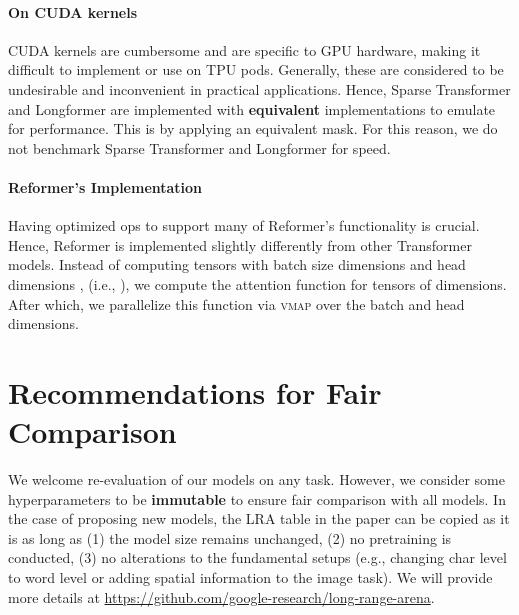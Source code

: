 \documentclass{article} \usepackage{iclr2021_conference,times}
\begin{document}
\paragraph{On CUDA kernels} 
CUDA kernels are cumbersome and are specific to GPU hardware, making it difficult to implement or use on TPU pods. Generally, these are considered to be undesirable and inconvenient in practical applications. Hence, Sparse Transformer and Longformer are implemented with \textbf{equivalent} implementations to emulate for performance. This is by applying an equivalent mask. For this reason, we do not benchmark Sparse Transformer and Longformer for speed.
\paragraph{Reformer's Implementation}
Having optimized ops to support many of Reformer's functionality is crucial. Hence, Reformer is implemented slightly differently from other Transformer models. Instead of computing tensors with batch size dimensions  and head dimensions , (i.e., ), we compute the attention function for tensors of  dimensions. After which, we parallelize this function via \textsc{vmap} over the batch and head dimensions. 


\section{Recommendations for Fair Comparison}
We welcome re-evaluation of our models on any task. However, we consider some hyperparameters to be \textbf{immutable} to ensure fair comparison with all models. In the case of proposing new models, the LRA table in the paper can be copied as it is as long as (1) the model size remains unchanged, (2) no pretraining is conducted, (3) no alterations to the fundamental setups (e.g., changing char level to word level or adding spatial information to the image task). We will provide more details at \url{https://github.com/google-research/long-range-arena}. 
\end{document}
